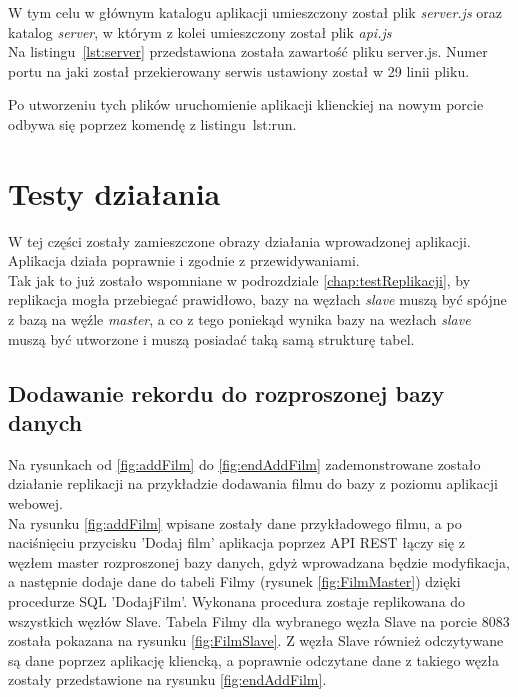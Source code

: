 W tym celu w głównym katalogu aplikacji umieszczony został plik \textit{server.js} oraz katalog \textit{server}, w którym z kolei umieszczony został plik \textit{api.js}\\

Na listingu~\ref{lst:server} przedstawiona została zawartość pliku server.js. Numer portu na jaki został przekierowany serwis ustawiony został w 29 linii pliku.

\lssetdef


\lssetdef


Po utworzeniu tych plików uruchomienie aplikacji klienckiej na nowym porcie odbywa się poprzez komendę z listingu~{lst:run}.

\lssetdef


\section{Testy działania}

W tej części zostały zamieszczone obrazy działania wprowadzonej aplikacji. Aplikacja działa poprawnie i zgodnie z przewidywaniami. \\

Tak jak to już zostało wspomniane w podrozdziale \ref{chap:testReplikacji}, by replikacja mogła przebiegać prawidłowo, bazy na węzłach \textit{slave} muszą być spójne z bazą na węźle \textit{master}, a co z tego poniekąd wynika bazy na wezłach \textit{slave} muszą być utworzone i muszą posiadać taką samą strukturę tabel.

\subsection{Dodawanie rekordu do rozproszonej bazy danych}
Na rysunkach od \ref{fig:addFilm} do \ref{fig:endAddFilm} zademonstrowane zostało działanie replikacji na przykładzie dodawania filmu do bazy z poziomu aplikacji webowej.\\

Na rysunku \ref{fig:addFilm} wpisane zostały dane przykładowego filmu, a po naciśnięciu przycisku 'Dodaj film' aplikacja poprzez API REST łączy się z węzłem master rozproszonej bazy danych, gdyż wprowadzana będzie modyfikacja, a następnie dodaje dane do tabeli Filmy (rysunek \ref{fig:FilmMaster}) dzięki procedurze SQL 'DodajFilm'. Wykonana procedura zostaje replikowana do wszystkich węzłów Slave. Tabela Filmy dla wybranego węzła Slave na porcie 8083 została pokazana na rysunku \ref{fig:FilmSlave}. Z węzła Slave również odczytywane są dane poprzez aplikację kliencką, a poprawnie odczytane dane z takiego węzła zostały przedstawione na rysunku \ref{fig:endAddFilm}.

